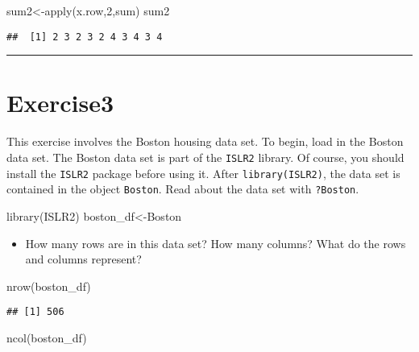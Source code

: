\documentclass[
]{article}
\newenvironment{Shaded}{\begin{snugshade}}{\end{snugshade}}
\newcommand{\DecValTok}[1]{\textcolor[rgb]{0.00,0.00,0.81}{#1}}
\newcommand{\FunctionTok}[1]{\textcolor[rgb]{0.00,0.00,0.00}{#1}}
\newcommand{\NormalTok}[1]{#1}
\newcommand{\OtherTok}[1]{\textcolor[rgb]{0.56,0.35,0.01}{#1}}
\providecommand{\tightlist}{%
  \setlength{\itemsep}{0pt}\setlength{\parskip}{0pt}}
\begin{document}
\begin{Shaded}
\begin{Highlighting}[]
\NormalTok{sum2}\OtherTok{\textless{}{-}}\FunctionTok{apply}\NormalTok{(x.row,}\DecValTok{2}\NormalTok{,sum)}
\NormalTok{sum2}
\end{Highlighting}
\end{Shaded}

\begin{verbatim}
##  [1] 2 3 2 3 2 4 3 4 3 4
\end{verbatim}

\begin{center}\rule{0.5\linewidth}{0.5pt}\end{center}

\hypertarget{exercise3}{%
\section{Exercise3}\label{exercise3}}

This exercise involves the Boston housing data set. To begin, load in
the Boston data set. The Boston data set is part of the \texttt{ISLR2}
library. Of course, you should install the \texttt{ISLR2} package before
using it. After \texttt{library(ISLR2)}, the data set is contained in
the object \texttt{Boston}. Read about the data set with
\texttt{?Boston}.

\begin{Shaded}
\begin{Highlighting}[]
\FunctionTok{library}\NormalTok{(ISLR2)}
\NormalTok{boston\_df}\OtherTok{\textless{}{-}}\NormalTok{Boston}
\end{Highlighting}
\end{Shaded}

\begin{itemize}
\tightlist
\item
  How many rows are in this data set? How many columns? What do the rows
  and columns represent?
\end{itemize}

\begin{Shaded}
\begin{Highlighting}[]
\FunctionTok{nrow}\NormalTok{(boston\_df)}
\end{Highlighting}
\end{Shaded}

\begin{verbatim}
## [1] 506
\end{verbatim}

\begin{Shaded}
\begin{Highlighting}[]
\FunctionTok{ncol}\NormalTok{(boston\_df)}
\end{Highlighting}
\end{Shaded}
\end{document}
